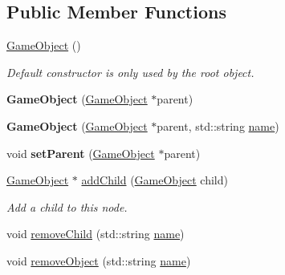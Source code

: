 \subsection*{Public Member Functions}
\begin{DoxyCompactItemize}
\item 
\hyperlink{classce_1_1game_1_1_game_object_a38079a556bd77da1c43d53b092b975ed}{Game\+Object} ()
\begin{DoxyCompactList}\small\item\em Default constructor is only used by the root object. \end{DoxyCompactList}\item 
\mbox{\label{classce_1_1game_1_1_game_object_a7405cbc0222f54df18d7524c6c4b0e54}} 
{\bfseries Game\+Object} (\hyperlink{classce_1_1game_1_1_game_object}{Game\+Object} $\ast$parent)
\item 
\mbox{\label{classce_1_1game_1_1_game_object_a546490e03f69dc2effa118f87c3bc7d0}} 
{\bfseries Game\+Object} (\hyperlink{classce_1_1game_1_1_game_object}{Game\+Object} $\ast$parent, std\+::string \hyperlink{classce_1_1game_1_1_game_object_a1de1f674c70df3bbba6aefb938ad8f32}{name})
\item 
\mbox{\label{classce_1_1game_1_1_game_object_a483e2391d1a903ef7e0a179bc7245529}} 
void {\bfseries set\+Parent} (\hyperlink{classce_1_1game_1_1_game_object}{Game\+Object} $\ast$parent)
\item 
\hyperlink{classce_1_1game_1_1_game_object}{Game\+Object} $\ast$ \hyperlink{classce_1_1game_1_1_game_object_a3633057fc9ed4ae0a3c724f59f125c4f}{add\+Child} (\hyperlink{classce_1_1game_1_1_game_object}{Game\+Object} child)
\begin{DoxyCompactList}\small\item\em Add a child to this node. \end{DoxyCompactList}\item 
void \hyperlink{classce_1_1game_1_1_game_object_ab00a9e4dcbadfa208df56e3cbed9e8d2}{remove\+Child} (std\+::string \hyperlink{classce_1_1game_1_1_game_object_a1de1f674c70df3bbba6aefb938ad8f32}{name})
\item 
void \hyperlink{classce_1_1game_1_1_game_object_ab700981d509605a9b1bef436207e5d54}{remove\+Object} (std\+::string \hyperlink{classce_1_1game_1_1_game_object_a1de1f674c70df3bbba6aefb938ad8f32}{name})

\end{DoxyCompactItemize}
